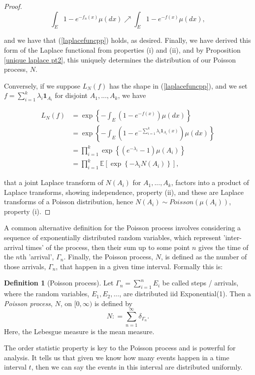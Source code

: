 \documentclass[11pt, oneside]{article}   	%
\theoremstyle{definition}
\newtheorem{definition}{Definition}[section]
\theoremstyle{remark}
\begin{document}
\begin{proof}
$$\int_E 1- e^{-f_n(x)} \mu(dx) \nearrow \int_E 1- e^{-f(x)} \mu(dx),$$

and we have that (\ref{laplacefuncpp}) holds, as desired. Finally, we have derived this form of the Laplace functional from properties (i) and (ii), and by Proposition \ref{unique laplace pt2}, this uniquely determines the distribution of our Poisson process, $N$.

Conversely, if we suppose $L_N(f)$ has the shape in (\ref{laplacefuncpp}), and we set $f= \sum_{i=1}^k \lambda_i \mathbf{1}_{A_i}$ for disjoint $A_1,..., A_k$, we have

\begin{align*}
  L_N(f) 
    &= \exp \left\{-\int_{E} (1-e^{-f(x)})\mu(dx)\right\} \\
    &= \exp \left\{-\int_{E} (1-e^{-\sum_{i=1}^k\lambda_i \mathbf{1}_{A_i}(x)})\mu(dx)\right\} \\
    &= \prod_{i=1}^k \exp \left\{\left(e^{-\lambda_i}-1 \right)\mu(A_i) \right\} \\
    &= \prod_{i=1}^k\mathbb{E}\left[\exp \left\{ -\lambda_i N(A_i)\right\}\right],
\end{align*}

that a joint Laplace transform of $N(A_i)$ for $A_1,...,A_k$, factors into a product of Laplace transforms, showing independence, property (ii), and these are Laplace transforms of a Poisson distribution, hence $N(A_i)\sim Poisson(\mu(A_i))$, property (i).
\end{proof}

A common alternative definition for the Poisson process involves considering a sequence of exponentially distributed random variables, which represent 'inter-arrival times' of the process, then their sum up to some point $n$ gives the time of the $n$th 'arrival', $\Gamma_n$. Finally, the Poisson process, $N$, is defined as the number of those arrivals, $\Gamma_n$, that happen in a given time interval. Formally this is:

\begin{definition}[Poisson process] \label{renewpp}
  Let $\Gamma_n=\sum_{i=1}^n E_i$ be called steps / arrivals, where the random variables, $E_1,E_2,...$, are distributed iid Exponential(1). Then a \textit{Poisson process}, $N$, on $[0,\infty)$ is defined by
  $$N : = \sum_{n=1}^\infty \delta_{\Gamma_n}.$$
  Here, the Lebesgue measure is the mean measure.
\end{definition}

The order statistic property is key to the Poisson process and is powerful for analysis. It tells us that given we know how many events happen in a time interval $t$, then we can say the events in this interval are distributed uniformly.
\end{document}
